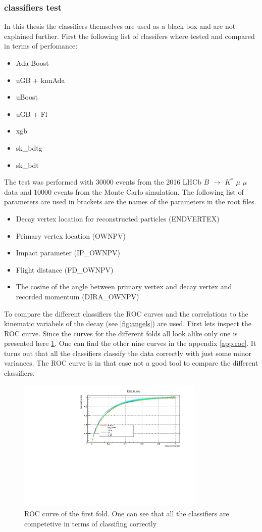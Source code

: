 \documentclass[english]{uzhpub}
\begin{document}
\subsubsection{classifiers test}
In this thesis the classifiers themselves are used as a black box and are not explained further.
First the following list of classifers where tested and compared in terms of perfomance:
\begin{itemize}
  \item Ada Boost
  \item uGB + knnAda
  \item uBoost
  \item uGB + Fl
  \item xgb
  \item sk\_bdtg
  \item sk\_bdt
\end{itemize}
The test was performed with 30000 events from the 2016 LHCb $B$ $\rightarrow$ $K^{*}$ $\mu$ $\mu$ data and 10000 events from the Monte Carlo simulation. The following list of parameters are used in brackets are the names of the parameters in the root files.
\begin{itemize}
  \item Decay vertex location for reconstructed particles (ENDVERTEX)
  \item Primary vertex location (OWNPV)
  \item Impact parameter (IP\_OWNPV)
  \item Flight distance (FD\_OWNPV)
  \item The cosine of the angle between primary vertex and decay vertex and recorded momentum (DIRA\_OWNPV)
\end{itemize}
To compare the different classifiers the ROC curves and the correlations to the kinematic variabels of the decay (see \ref{fig:angels}) are used. First lets inspect the ROC curve. Since the curves for the different folds all look alike only one is presented here \ref{fig:roc}. One can find the other nine curves in the appendix \ref{app:roc}.
It turns out that all the classifiers classify the data correctly with just some minor variances. The ROC curve is in that case not a good tool to compare the different classifiers.
\begin{figure}[H]
  \centering
  \includegraphics[width=0.8\textwidth]{roc/fold_0_roc.pdf}
  \caption{ROC curve of the first fold. One can see that all the classifiers are competetive in terms of classifing correctly}
  \label{fig:roc}
\end{figure}
\end{document}
